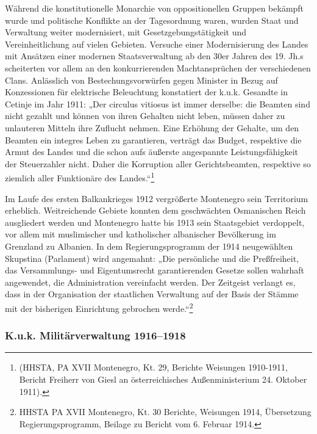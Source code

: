 Während die konstitutionelle Monarchie von oppositionellen Gruppen bekämpft wurde und politische Konflikte an der Tagesordnung waren, wurden Staat und Verwaltung weiter modernisiert, mit Gesetzgebungstätigkeit und Vereinheitlichung auf vielen Gebieten. Versuche einer Modernisierung des Landes mit Ansätzen einer modernen Staatsverwaltung ab den 30er Jahren des 19. Jh.s scheiterten vor allem an den konkurrierenden Machtansprüchen der verschiedenen Clans. Anlässlich von Bestechungsvorwürfen gegen Minister in Bezug auf Konzessionen für elektrische Beleuchtung konstatiert der k.u.k. Gesandte in Cetinje im Jahr 1911: „Der circulus vitiosus ist immer derselbe: die Beamten sind nicht gezahlt und können von ihren Gehalten nicht leben, müssen daher zu unlauteren Mitteln ihre Zuflucht nehmen. Eine Erhöhung der Gehalte, um den Beamten ein integres Leben zu garantieren, verträgt das Budget, respektive die Armut des Landes und die schon aufs äußerste angespannte Leistungsfähigkeit der Steuerzahler nicht. Daher die Korruption aller Gerichtsbeamten, respektive so ziemlich aller Funktionäre des Landes.“\footnote{(HHSTA, PA XVII Montenegro, Kt. 29, Berichte Weisungen 1910-1911, Bericht Freiherr von Giesl an österreichisches Außenministerium 24. Oktober 1911).}\par

Im Laufe des ersten Balkankrieges 1912 vergrößerte Montenegro sein Territorium erheblich. Weitreichende Gebiete konnten dem geschwächten Osmanischen Reich ausgliedert werden und Montenegro hatte bis 1913 sein Staatsgebiet verdoppelt, vor allem mit muslimischer und katholischer albanischer Bevölkerung im Grenzland zu Albanien. In dem Regierungsprogramm der 1914 neugewählten Skupstina (Parlament) wird angemahnt: „Die persönliche und die Preßfreiheit, das Versammlungs- und Eigentumsrecht garantierenden Gesetze sollen wahrhaft angewendet, die Administration vereinfacht werden. Der Zeitgeist verlangt es, dass in der Organisation der staatlichen Verwaltung auf der Basis der Stämme mit der bisherigen Einrichtung gebrochen werde.“\footnote{HHSTA PA XVII Montenegro, Kt. 30 Berichte, Weisungen 1914, Übersetzung Regierungsprogramm, Beilage zu Bericht vom 6. Februar 1914.}

\subsubsection{K.u.k. Militärverwaltung 1916–1918}

